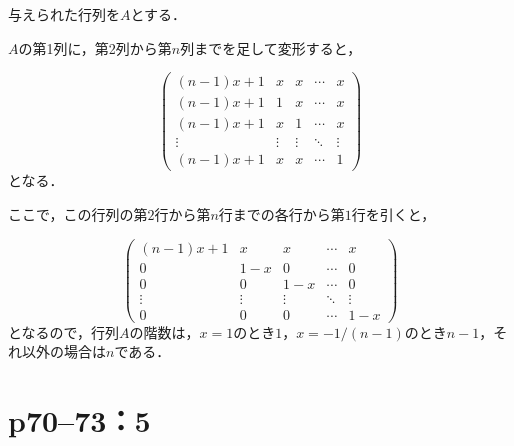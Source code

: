 \documentclass[a4paper,10pt,fleqn]{ltjsarticle}
\begin{document}
\begin{leftbar}
  与えられた行列を$A$とする．

  $A$の第1列に，第2列から第$n$列までを足して変形すると，

  \[
    \begin{pmatrix}
      (n-1)x+1 & x      & x      & \cdots & x      \\
      (n-1)x+1 & 1      & x      & \cdots & x      \\
      (n-1)x+1 & x      & 1      & \cdots & x      \\
      \vdots   & \vdots & \vdots & \ddots & \vdots \\
      (n-1)x+1 & x      & x      & \cdots & 1
    \end{pmatrix}
  \]
  となる．

  ここで，この行列の第$2$行から第$n$行までの各行から第$1$行を引くと，

  \[
    \begin{pmatrix}
      (n-1)x+1 & x      & x      & \cdots & x      \\
      0        & 1-x    & 0      & \cdots & 0      \\
      0        & 0      & 1-x    & \cdots & 0      \\
      \vdots   & \vdots & \vdots & \ddots & \vdots \\
      0        & 0      & 0      & \cdots & 1 -x
    \end{pmatrix}
  \]
  となるので，行列$A$の階数は，$x=1$のとき$1$，$ x= -1/(n-1)$のとき$n-1$，それ以外の場合は$n$である．
\end{leftbar}


\newpage

\section*{p70--73：5}
\end{document}
